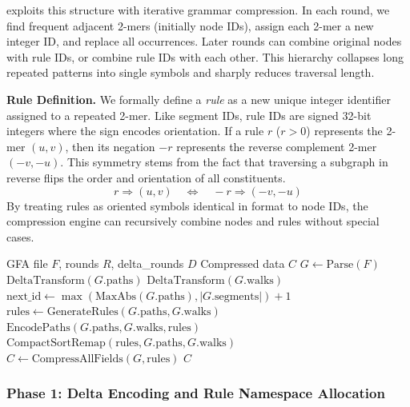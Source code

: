 \gfaz exploits this structure with iterative grammar compression. In each round, we find frequent adjacent 2-mers (initially node IDs), assign each 2-mer a new integer ID, and replace all occurrences. Later rounds can combine original nodes with rule IDs, or combine rule IDs with each other. This hierarchy collapses long repeated patterns into single symbols and sharply reduces traversal length.

\noindent \textbf{Rule Definition.}
We formally define a \emph{rule} as a new unique integer identifier assigned to a repeated 2-mer. Like segment IDs, rule IDs are signed 32-bit integers where the sign encodes orientation. If a rule $r$ ($r > 0$) represents the 2-mer $(u, v)$, then its negation $-r$ represents the reverse complement 2-mer $(-v, -u)$. This symmetry stems from the fact that traversing a subgraph in reverse flips the order and orientation of all constituents.
\begin{equation}
  r \Rightarrow (u, v) \quad \iff \quad -r \Rightarrow (-v, -u)
\end{equation}
By treating rules as oriented symbols identical in format to node IDs, the compression engine can recursively combine nodes and rules without special cases.

\begin{algorithm}[t]
  \caption{\thiswork Compression Pipeline}
  \label{alg:compression}
  \begin{algorithmic}[1]
    \REQUIRE GFA file $F$, rounds $R$, delta\_rounds $D$
    \ENSURE Compressed data $C$
    \STATE $G \gets \text{Parse}(F)$
    \STATE $\text{DeltaTransform}(G.\text{paths})$
    \STATE $\text{DeltaTransform}(G.\text{walks})$
    \ENDFOR
    \STATE $\text{next\_id} \gets \max(\text{MaxAbs}(G.\text{paths}), |G.\text{segments}|) + 1$
    \STATE $\text{rules} \gets \text{GenerateRules}(G.\text{paths}, G.\text{walks})$
    \STATE $\text{EncodePaths}(G.\text{paths}, G.\text{walks}, \text{rules})$
    \STATE $\text{CompactSortRemap}(\text{rules}, G.\text{paths}, G.\text{walks})$
    \ENDFOR
    \STATE $C \gets \text{CompressAllFields}(G, \text{rules})$
    \RETURN $C$
  \end{algorithmic}
\end{algorithm}

\subsubsection{Phase 1: Delta Encoding and Rule Namespace Allocation}

